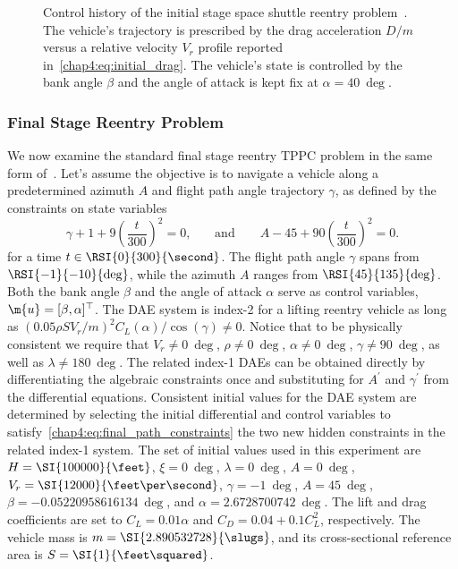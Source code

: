\begin{figure}[htb]
  \centering
  \small{}
  \caption{Control history of the initial stage space shuttle reentry problem~\cite{brenan1995numerical}. The vehicle's trajectory is prescribed by the drag acceleration $D/m$ versus a relative velocity $V_r$ profile reported in~\eqref{chap4:eq:initial_drag}. The vehicle's state is controlled by the bank angle $\beta$ and the angle of attack is kept fix at $\alpha = \SI{40}{\deg}$.}
  \label{chap4:fig:tppc_initial}
\end{figure}

\subsubsection{Final Stage Reentry Problem}

We now examine the standard final stage reentry \ac{TPPC} problem in the same form of~\cite{brenan1995numerical}. Let's assume the objective is to navigate a vehicle along a predetermined azimuth $A$ and flight path angle trajectory $\gamma$, as defined by the constraints on state variables
%
\begin{equation}
  \gamma + 1 + 9\left(\dfrac{t}{300}\right)^2 = 0 \text{,}
  \qquad \text{and} \qquad
  A - 45 + 90\left(\dfrac{t}{300}\right)^2 = 0 \text{.}
  \label{chap4:eq:final_path_constraints}
\end{equation}
%
for a time $t \in \RSI{0}{300}{\second}$. The flight path angle $\gamma$ spans from $\RSI{-1}{-10}{\deg}$, while the azimuth $A$ ranges from $\RSI{45}{135}{\deg}$. Both the bank angle $\beta$ and the angle of attack $\alpha$ serve as control variables, \ie{} $\m{u} = [\beta, \alpha]^\top$. The \ac{DAE} system is index-2 for a lifting reentry vehicle as long as $(0.05 \rho S V_r/m)^2 C_L(\alpha)/\cos(\gamma) \neq 0$. Notice that to be physically consistent we require that $V_r \neq \SI{0}{\deg}$, $\rho\neq \SI{0}{\deg}$, $\alpha \neq \SI{0}{\deg}$, $\gamma \neq \SI{90}{\deg}$, as well as $\lambda \neq \SI{180}{\deg}$. The related index-1 \acp{DAE} can be obtained directly by differentiating the algebraic constraints once and substituting for $A^\prime$ and $\gamma^\prime$ from the differential equations. Consistent initial values for the \ac{DAE} system are determined by selecting the initial differential and control variables to satisfy~\eqref{chap4:eq:final_path_constraints} the two new hidden constraints in the related index-1 system. The set of initial values used in this experiment are $H = \SI{100000}{\feet}$, $\xi = \SI{0}{\deg}$, $\lambda = \SI{0}{\deg}$, $A = \SI{0}{\deg}$, $V_r = \SI{12000}{\feet\per\second}$, $\gamma = \SI{-1}{\deg}$, $A = \SI{45}{\deg}$, $\beta = \SI{-0.05220958616134}{\deg}$, and $\alpha = \SI{2.6728700742}{\deg}$. The lift and drag coefficients are set to $C_L = 0.01\alpha$ and $C_D = 0.04 + 0.1C_L^2$, respectively. The vehicle mass is $m = \SI{2.890532728}{\slugs}$, and its cross-sectional reference area is $S = \SI{1}{\feet\squared}$.

